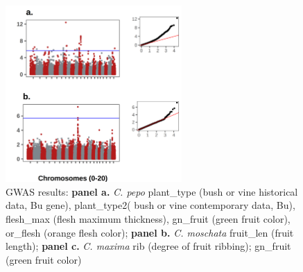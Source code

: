 \documentclass[utf8]{FrontiersinHarvard} %
\begin{document}
\clearpage

\begin{figure}[h]
	\caption{ \label{fig:7}}
\end{figure}

\clearpage

\begin{figure}[h]
	\begin{center}
		\includegraphics[width=0.6\textwidth]{../../figures/new_gwas.png}
	\end{center}
	\caption{GWAS results: \textbf{panel a.} \textit{C. pepo} plant\_type (bush or vine historical data, Bu gene), plant\_type2( bush or vine contemporary data, Bu), flesh\_max (flesh maximum thickness), gn\_fruit (green fruit color), or\_flesh (orange flesh color); \textbf{panel b.} \textit{C. moschata} fruit\_len (fruit length); \textbf{panel c.} \textit{C. maxima} rib (degree of fruit ribbing); gn\_fruit (green fruit color) \label{fig:8}}
\end{figure}

\clearpage
\end{document}
